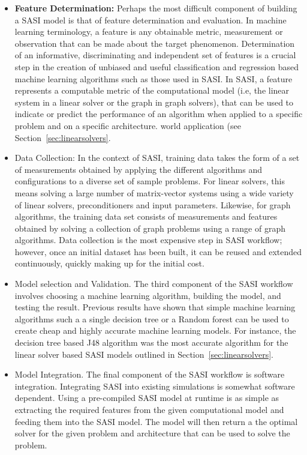 \begin{itemize}
 \item {\bf Feature Determination:} Perhaps the most difficult component of building a SASI model is that of feature determination and evaluation. In machine learning terminology, a feature is any obtainable metric, measurement or observation that can be made about the target phenomenon. Determination of an informative, discriminating and independent set of features is a crucial step in the creation of unbiased and useful classification and regression based machine learning algorithms such as those used in SASI. In SASI, a feature represents a computable metric of the computational model (i.e, the linear system in a linear solver or the graph in graph solvers), that can be used to indicate or predict the performance of an algorithm when applied to a specific problem and on a specific architecture. 
 world application (see Section~\ref{sec:linearsolvers}. 
 
 \item Data Collection: In the context of SASI, training data takes the form of a set of measurements obtained by applying the different algorithms and configurations to a diverse set of sample problems. For linear solvers, this means solving a large number of matrix-vector systems using a wide variety of linear solvers, preconditioners and input parameters. Likewise, for graph algorithms, the training data set consists of measurements and features obtained by solving a collection of graph problems using a range of graph algorithms. Data collection is the most expensive step in SASI workflow; however, once an initial dataset has been built, it can be reused and extended continuously, quickly making up for the initial cost. 
 
 \item Model selection and Validation. The third component of the SASI workflow involves choosing a machine learning algorithm, building the model, and testing the result. Previous results have shown that simple machine learning algorithms such a a single decision tree or a Random forest can be used to create cheap and highly accurate machine learning models. For instance, the decision tree based J48 algorithm was the most accurate algorithm for the linear solver based SASI models outlined in Section~\ref{sec:linearsolvers}.  
 
 \item Model Integration. The final component of the SASI workflow is software integration. Integrating SASI into existing simulations is somewhat software dependent. Using a pre-compiled SASI model at runtime is as simple as extracting the required features from the given computational model and feeding them into the SASI model. The model will then return a the optimal solver for the given problem and architecture that can be used to solve the problem.  

\end{itemize}

